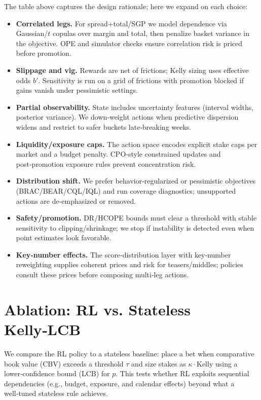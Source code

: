 The table above captures the design rationale; here we expand on each choice:
\begin{itemize}
  \item \textbf{Correlated legs.} For spread+total/SGP we model dependence via Gaussian/$t$ copulas over margin and total, then penalize basket variance in the objective. OPE and simulator checks ensure correlation risk is priced before promotion.
  \item \textbf{Slippage and vig.} Rewards are net of frictions; Kelly sizing uses effective odds $b'$. Sensitivity is run on a grid of frictions with promotion blocked if gains vanish under pessimistic settings.
  \item \textbf{Partial observability.} State includes uncertainty features (interval widths, posterior variance). We down‑weight actions when predictive dispersion widens and restrict to safer buckets late‑breaking weeks.
  \item \textbf{Liquidity/exposure caps.} The action space encodes explicit stake caps per market and a budget penalty. CPO‑style constrained updates and post‑promotion exposure rules prevent concentration risk.
  \item \textbf{Distribution shift.} We prefer behavior‑regularized or pessimistic objectives (BRAC/BEAR/CQL/IQL) and run coverage diagnostics; unsupported actions are de‑emphasized or removed.
  \item \textbf{Safety/promotion.} DR/HCOPE bounds must clear a threshold with stable sensitivity to clipping/shrinkage; we stop if instability is detected even when point estimates look favorable.
  \item \textbf{Key‑number effects.} The score‑distribution layer with key‑number reweighting supplies coherent prices and risk for teasers/middles; policies consult these prices before composing multi‑leg actions.
\end{itemize}

\section{Ablation: RL vs. Stateless Kelly‑LCB}\label{sec:rl-vs-baseline}
We compare the RL policy to a stateless baseline: place a bet when comparative book value (CBV) exceeds a threshold $\tau$ and size stakes as $\kappa\cdot$Kelly using a lower‑confidence bound (LCB) for $p$. This tests whether RL exploits sequential dependencies (e.g., budget, exposure, and calendar effects) beyond what a well‑tuned stateless rule achieves.

